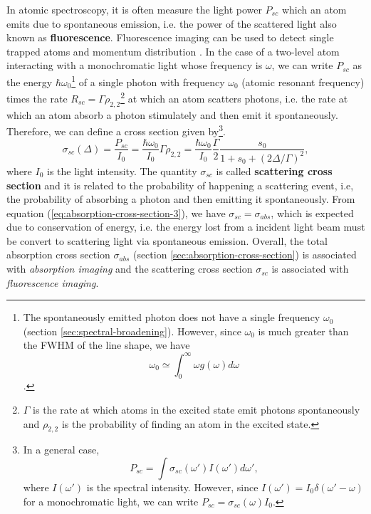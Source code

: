 {In atomic spectroscopy, it is often measure the light power $ P_{sc} $ which an atom emits due to spontaneous emission, i.e. the power of the scattered light also known as \textbf{fluorescence}. Fluorescence imaging can be used to detect single trapped atoms \cite{kuhr2001deterministic} and momentum distribution \cite{fuhrmanek2010imaging, bucker2009single}. In the case of a two-level atom interacting with a monochromatic light whose frequency is $ \omega $, we can write $ P_{sc} $ as the energy $ \hbar \omega_0 $\footnote{The spontaneously emitted photon does not have a single frequency $ \omega_0 $ (section \ref{sec:spectral-broadening}). However, since $ \omega_0 $ is much greater than the FWHM of the line shape, we have $$ \omega_0 \simeq \int_{0}^{\infty} \omega g(\omega) d\omega $$.} of a single photon with frequency $ \omega_0 $ (atomic resonant frequency) times the rate $ R_{sc} = \Gamma \rho_{2,2} $\footnote{$ \Gamma $ is the rate at which atoms in the excited state emit photons spontaneously and $ \rho_{2,2} $ is the probability of finding an atom in the excited state.} at which an atom scatters photons, i.e. the rate at which an atom absorb a photon stimulately and then emit it spontaneously. Therefore, we can define a cross section given by\footnote{In a general case, $$ P_{sc} = \int \sigma_{sc}(\omega') I(\omega') d\omega', $$ where $ I(\omega') $ is the spectral intensity. However, since $ I(\omega')= I_0 \delta(\omega' - \omega) $ for a monochromatic light, we can write $  P_{sc} = \sigma_{sc}(\omega) I_0 $.}.
\begin{equation}
	\sigma_{sc}(\Delta) = \frac{P_{sc}}{I_0} =  \frac{\hbar \omega_0}{I_0} \Gamma \rho_{2,2} = \frac{\hbar \omega_0}{I_0} \frac{\Gamma}{2} \frac{s_0}{1 + s_0 + (2\Delta / \Gamma)^2},
	\label{eq:scattering-cross-section}
\end{equation}
where $ I_0 $ is the light intensity. The quantity $ \sigma_{sc} $ is called \textbf{scattering cross section} and it is related to the probability of happening a scattering event, i.e, the probability of absorbing a photon and then emitting it spontaneously. From equation (\ref{eq:absorption-cross-section-3}), we have $ \sigma_{sc} = \sigma_{abs} $, which is expected due to conservation of energy, i.e. the energy lost from a incident light beam must be convert to scattering light via spontaneous emission. Overall, the total absorption cross section $ \sigma_{abs} $ (section \ref{sec:absorption-cross-section}) is associated with \textit{absorption imaging} and the scattering cross section $ \sigma_{sc} $ is associated with \textit{fluorescence imaging}.

}
